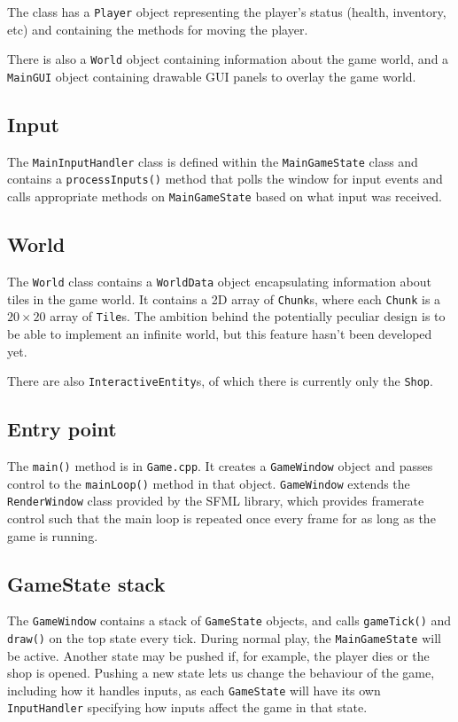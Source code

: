 \documentclass[10pt,twoside,a4paper]{article}
\begin{document}
The class has a \verb|Player| object representing the player's status (health, inventory, etc) and containing the methods for moving the player.

There is also a \verb|World| object containing information about the game world, and a \verb|MainGUI| object containing drawable GUI panels to overlay the game world.

\subsection*{Input}

The \verb|MainInputHandler| class is defined within the \verb|MainGameState| class and contains a \verb|processInputs()| method that polls the window for input events and calls appropriate methods on \verb|MainGameState| based on what input was received.

\subsection*{World}

The \verb|World| class contains a \verb|WorldData| object encapsulating information about tiles in the game world. It contains a 2D array of \verb|Chunk|s, where each \verb|Chunk| is a $20 \times 20$ array of \verb|Tile|s. The ambition behind the potentially peculiar design is to be able to implement an infinite world, but this feature hasn't been developed yet.

There are also \verb|InteractiveEntity|s, of which there is currently only the \verb|Shop|.

\subsection*{Entry point}

The \verb|main()| method is in \verb|Game.cpp|. It creates a \verb|GameWindow| object and passes control to the \verb|mainLoop()| method in that object. \verb|GameWindow| extends the \verb|RenderWindow| class provided by the SFML library, which provides framerate control such that the main loop is repeated once every frame for as long as the game is running.

\subsection*{GameState stack}

The \verb|GameWindow| contains a stack of \verb|GameState| objects, and calls \verb|gameTick()| and \verb|draw()| on the top state every tick. During normal play, the \verb|MainGameState| will be active. Another state may be pushed if, for example, the player dies or the shop is opened. Pushing a new state lets us change the behaviour of the game, including how it handles inputs, as each \verb|GameState| will have its own \verb|InputHandler| specifying how inputs affect the game in that state.
\end{document}
